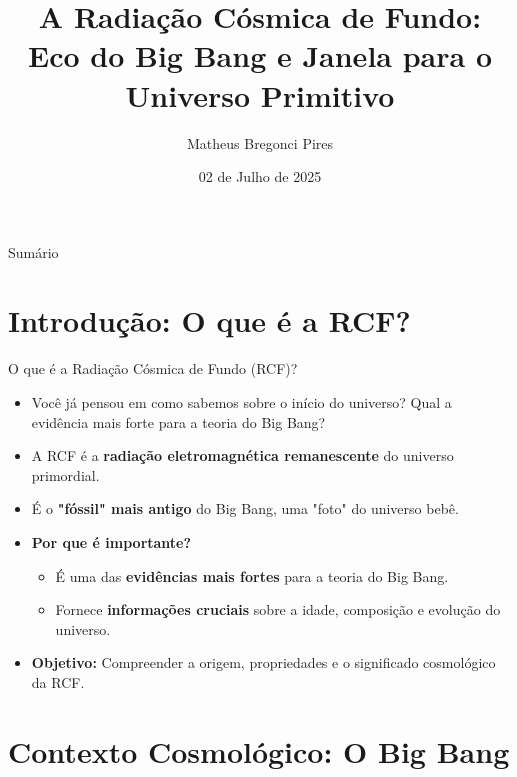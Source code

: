 \documentclass{beamer}
\title[RCF]{A Radiação Cósmica de Fundo: Eco do Big Bang e Janela para o Universo Primitivo}
\author[Matheus Bregonci Pires]{Matheus Bregonci Pires}
\institute[Física - UFES]{Física - UFES}
\date{02 de Julho de 2025} %
\begin{document}
\begin{frame}
    \titlepage
\end{frame}

\begin{frame}{Sumário}
    \tableofcontents
\end{frame}

\section{Introdução: O que é a RCF?}

\begin{frame}{O que é a Radiação Cósmica de Fundo (RCF)?}
    \begin{itemize}
        \item Você já pensou em como sabemos sobre o início do universo? Qual a evidência mais forte para a teoria do Big Bang?
        \item A RCF é a \textbf{radiação eletromagnética remanescente} do universo primordial.
        \item É o \textbf{"fóssil" mais antigo} do Big Bang, uma "foto" do universo bebê.
        \item \textbf{Por que é importante?}
        \begin{itemize}
            \item É uma das \textbf{evidências mais fortes} para a teoria do Big Bang.
            \item Fornece \textbf{informações cruciais} sobre a idade, composição e evolução do universo.
        \end{itemize}
        \item \textbf{Objetivo:} Compreender a origem, propriedades e o significado cosmológico da RCF.
    \end{itemize}
\end{frame}

\section{Contexto Cosmológico: O Big Bang}
\end{document}
